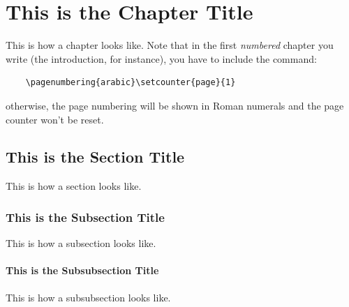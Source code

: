 \chapter{This is the Chapter Title}\label{ch:chapter}
\setcounter{page}{1}

This is how a chapter looks like. Note that in the first \textit{numbered} chapter you write (the introduction, for instance), you have to include the command:
\begin{verbatim}
	\pagenumbering{arabic}\setcounter{page}{1}
\end{verbatim}
otherwise, the page numbering will be shown in Roman numerals and the page counter won't be reset.

\section{This is the Section Title}\label{sec:section}

This is how a section looks like. 

\subsection{This is the Subsection Title}\label{subsec:subsection}

This is how a subsection looks like. 

\subsubsection{This is the Subsubsection Title}

This is how a subsubsection looks like. 

